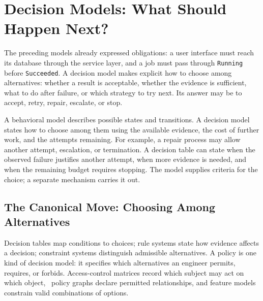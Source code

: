 


\chapter{Decision Models: What Should Happen Next?}

The preceding models already expressed obligations: a user interface must reach its database through the service layer, and a job must pass through \texttt{Running} before \texttt{Succeeded}. A decision model makes explicit how to choose among alternatives: whether a result is acceptable, whether the evidence is sufficient, what to do after failure, or which strategy to try next. Its answer may be to accept, retry, repair, escalate, or stop.

A behavioral model describes possible states and transitions. A decision model states how to choose among them using the available evidence, the cost of further work, and the attempts remaining. For example, a repair process may allow another attempt, escalation, or termination. A decision table can state when the observed failure justifies another attempt, when more evidence is needed, and when the remaining budget requires stopping. The model supplies criteria for the choice; a separate mechanism carries it out.

\section{The Canonical Move: Choosing Among Alternatives}\label{heading:the-canonical-move-permitted-alternatives}


Decision tables map conditions to choices; rule systems state how evidence affects a decision; constraint systems distinguish admissible alternatives. A policy is one kind of decision model: it specifies which alternatives an engineer permits, requires, or forbids. Access-control matrices record which subject may act on which object,~\citep{lampson1974} policy graphs declare permitted relationships, and feature models constrain valid combinations of options.

